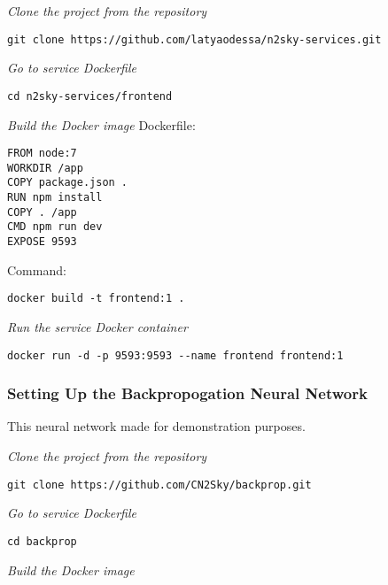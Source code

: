 \emph{Clone the project from the repository}
 \begin{lstlisting}
git clone https://github.com/latyaodessa/n2sky-services.git 
\end{lstlisting}

\emph{Go to service Dockerfile}
 \begin{lstlisting}
cd n2sky-services/frontend
\end{lstlisting}

\emph{Build the Docker image}
Dockerfile:
 \begin{lstlisting}
FROM node:7
WORKDIR /app
COPY package.json .
RUN npm install
COPY . /app
CMD npm run dev
EXPOSE 9593
\end{lstlisting}

Command:
 \begin{lstlisting}
docker build -t frontend:1 .
\end{lstlisting}


\emph{Run the service Docker container}
 \begin{lstlisting}
docker run -d -p 9593:9593 --name frontend frontend:1
\end{lstlisting}





\subsubsection{Setting Up the Backpropogation Neural Network}\label{backprop setup}

This neural network made for demonstration purposes. 

\emph{Clone the project from the repository}
 \begin{lstlisting}
git clone https://github.com/CN2Sky/backprop.git
\end{lstlisting}

\emph{Go to service Dockerfile}
 \begin{lstlisting}
cd backprop
\end{lstlisting}

\emph{Build the Docker image}

